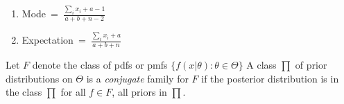 \documentclass[a4paper,english,12pt]{article}
\begin{document}
\begin{enumerate}
\item Mode\,\,\,=\,\,\,$\displaystyle{\frac{\sum\limits_i {x_i}+a-1}{a+b+n-2}}$
\item Expectation\,\,\,=\,\,\,$\displaystyle{\frac{\sum\limits_i {x_i}+a}{a+b+n}}$
\end{enumerate}

\begin{defn}{Let $F$ denote the class of pdfs or pmfs
 $\{f(x|\theta):\theta \in \Theta\}$
 A class $\prod$ of prior distributions on $\Theta$ is a \textit{conjugate} family for $F$ if the posterior distribution is in the class $\prod$ for all $f \in F$, all priors in $\prod$.}
\end{defn}
\end{document}
